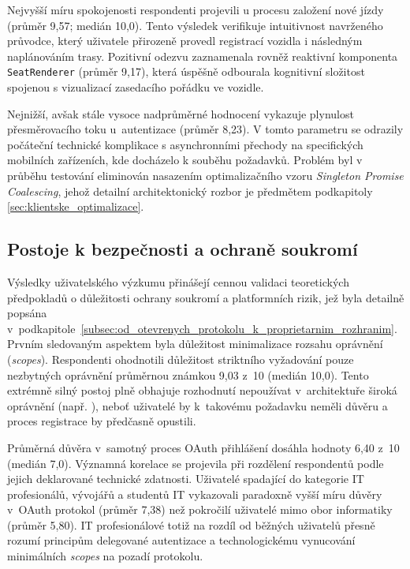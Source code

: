 \documentclass[male,czech,api_bc]{kitheses}
\begin{document}
Nejvyšší míru spokojenosti respondenti projevili u procesu založení nové jízdy (průměr 9,57; medián 10,0). Tento výsledek verifikuje intuitivnost navrženého průvodce, který uživatele přirozeně provedl registrací vozidla i následným naplánováním trasy. Pozitivní odezvu zaznamenala rovněž reaktivní komponenta \texttt{SeatRenderer} (průměr 9,17), která úspěšně odbourala kognitivní složitost spojenou s vizualizací zasedacího pořádku ve vozidle.

Nejnižší, avšak stále vysoce nadprůměrné hodnocení vykazuje plynulost přesměrovacího toku u~autentizace (průměr 8,23). V tomto parametru se odrazily počáteční technické komplikace s asynchronními přechody na specifických mobilních zařízeních, kde docházelo k souběhu požadavků. Problém byl v průběhu testování eliminován nasazením optimalizačního vzoru \textit{Singleton Promise Coalescing}, jehož detailní architektonický rozbor je předmětem podkapitoly \vref{sec:klientske_optimalizace}.

\subsection{Postoje k bezpečnosti a ochraně soukromí}
\label{subsec:bezpecnost_soukromi}

Výsledky uživatelského výzkumu přinášejí cennou validaci teoretických předpokladů o důležitosti ochrany soukromí a platformních rizik, jež byla detailně popsána v~podkapitole~\vref{subsec:od_otevrenych_protokolu_k_proprietarnim_rozhranim}. Prvním sledovaným aspektem byla důležitost minimalizace rozsahu oprávnění (\textit{scopes}). Respondenti ohodnotili důležitost striktního vyžadování pouze nezbytných oprávnění průměrnou známkou 9,03 z~10 (medián 10,0). Tento extrémně silný postoj plně obhajuje rozhodnutí nepoužívat v~architektuře široká oprávnění (např. ), neboť uživatelé by k~takovému požadavku neměli důvěru a proces registrace by předčasně opustili.

Průměrná důvěra v~samotný proces OAuth přihlášení dosáhla hodnoty 6,40 z~10 (medián 7,0). Významná korelace se projevila při rozdělení respondentů podle jejich deklarované technické zdatnosti. Uživatelé spadající do kategorie IT profesionálů, vývojářů a studentů IT vykazovali paradoxně vyšší míru důvěry v~OAuth protokol (průměr 7,38) než pokročilí uživatelé mimo obor informatiky (průměr 5,80). IT profesionálové totiž na rozdíl od běžných uživatelů přesně rozumí principům delegované autentizace a technologickému vynucování minimálních \textit{scopes} na pozadí protokolu.
\end{document}
